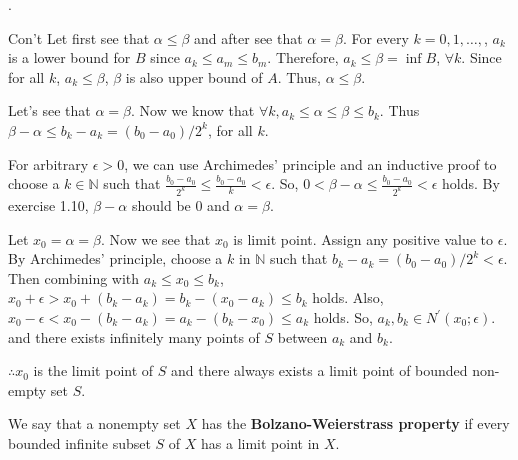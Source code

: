 \documentclass[8pt]{beamer}
\newcommand{\mbb}[1]{\mathbb{#1}}
\newcommand{\tb}[1]{\textbf{#1}}
\begin{document}
\begin{frame}{.}
    \begin{block}{Con't}
        Let first see that $\alpha \leq \beta$ and after see that $\alpha = \beta$.
        For every $k=0, 1, \dots,$, $a_k$ is a lower bound for $B$ since $a_k \leq a_m \leq b_m$.
        Therefore, $a_k \leq \beta = \inf B$, $\forall k$.
        Since for all $k$, $a_k \leq \beta$, $\beta$ is also upper bound of $A$. Thus, $\alpha \leq \beta$.

        Let's see that $\alpha = \beta$.
        Now we know that $\forall k, a_k \leq \alpha \leq \beta \leq b_k$.
        Thus $\beta - \alpha \leq b_k - a_k = (b_0 - a_0)/2^{k}$, for all $k$.

        For arbitrary $\epsilon > 0$, we can use Archimedes' principle and an inductive proof to choose a $k \in \mbb{N}$
        such that $ \frac{b_0- a_0}{2^k} \leq \frac{b_0 - a_0}{k} <\epsilon$.
        So, $0 < \beta - \alpha \leq \frac{b_0-a_0}{2^k} < \epsilon$ holds.
        By exercise 1.10, $\beta - \alpha$ should be $0$ and $\alpha = \beta$.

        Let $x_0 = \alpha = \beta$.
        Now we see that $x_0$ is limit point.
        Assign any positive value to $\epsilon$.
        By Archimedes' principle, choose a $k$ in $\mbb{N}$ such that $ b_k - a_k = (b_0 - a_0)/2^k <\epsilon$.
        Then combining with $a_k \leq x_0 \leq b_k$, $x_0 + \epsilon > x_0 + (b_k - a_k) = b_k - (x_0 - a_k) \leq b_k$ holds.
        Also, $x_0 - \epsilon < x_0 - (b_k - a_k) = a_k - (b_k - x_0) \leq a_k$ holds.
        So, $a_k, b_k \in N^\prime(x_0; \epsilon)$. and there exists infinitely many points of $S$ between $a_k$ and $b_k$.

        $\therefore x_0$ is the limit point of $S$ and there always exists a limit point of bounded non-empty set $S$.
    \end{block}

    \begin{definition}
        We say that a nonempty set $X$ has the \tb{Bolzano-Weierstrass property} if every bounded infinite subset $S$ of $X$ has a limit point in $X$. 
    \end{definition}
\end{frame}
\end{document}

